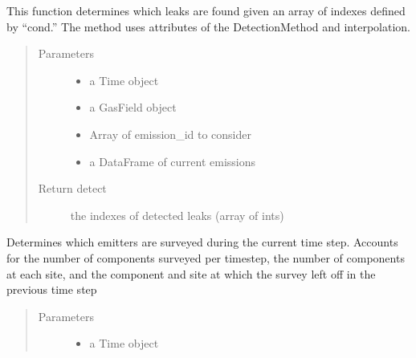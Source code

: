 \documentclass[letterpaper,10pt,english]{sphinxmanual}
\begin{document}
\begin{fulllineitems}
\begin{fulllineitems}
\label{\detokenize{index:feast.DetectionModules.comp_survey.CompSurvey.detect_prob_curve}}
This function determines which leaks are found given an array of indexes defined by “cond.”
The method uses attributes of the DetectionMethod and interpolation.
\begin{quote}\begin{description}
\item[{Parameters}] \leavevmode\begin{itemize}
\item {} 
 \textendash{} a Time object

\item {} 
 \textendash{} a GasField object

\item {} 
 \textendash{} Array of emission\_id to consider

\item {} 
 \textendash{} a DataFrame of current emissions

\end{itemize}

\item[{Return detect}] \leavevmode
the indexes of detected leaks (array of ints)

\end{description}\end{quote}

\end{fulllineitems}


\begin{fulllineitems}
\label{\detokenize{index:feast.DetectionModules.comp_survey.CompSurvey.emitters_surveyed}}
Determines which emitters are surveyed during the current time step.
Accounts for the number of components surveyed per timestep, the number of components at each site, and the
component and site at which the survey left off in the previous time step
\begin{quote}\begin{description}
\item[{Parameters}] \leavevmode\begin{itemize}
\item {} 
 \textendash{} a Time object


\end{itemize}
\end{description}
\end{quote}
\end{fulllineitems}
\end{fulllineitems}
\end{document}
